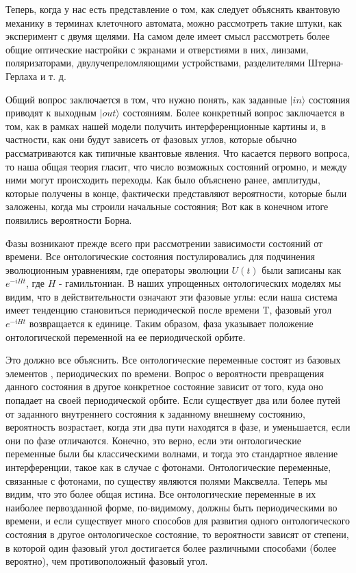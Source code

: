 \documentclass[main.tex]{subfiles}
\begin{document}
Теперь, когда у нас есть представление о том, как следует объяснять квантовую механику в терминах клеточного автомата, можно рассмотреть такие штуки, как эксперимент с двумя щелями. На самом деле имеет смысл рассмотреть более общие оптические настройки с экранами и отверстиями в них, линзами, поляризаторами, двулучепреломляющими устройствами, разделителями Штерна-Герлаха и т. д.

Общий вопрос заключается в том, что нужно понять, как заданные $| in\rangle$ состояния приводят к выходным $| out\rangle$ состояниям. Более конкретный вопрос заключается в том, как в рамках нашей модели получить интерференционные картины и, в частности, как они будут зависеть от фазовых углов, которые обычно рассматриваются как типичные квантовые явления.
Что касается первого вопроса, то наша общая теория гласит, что число возможных состояний огромно, и между ними могут происходить переходы. Как было объяснено ранее, амплитуды, которые получены в конце, фактически представляют вероятности, которые были заложены, когда мы строили начальные состояния; Вот как в конечном итоге появились вероятности Борна.

Фазы возникают прежде всего при рассмотрении зависимости состояний от времени. Все онтологические состояния постулировались для подчинения эволюционным уравнениям, где операторы эволюции $U(t)$ были записаны как $e^{-iHt}$, где $H$ - гамильтониан. В наших упрощенных онтологических моделях мы видим, что в действительности означают эти фазовые углы: если наша система имеет тенденцию становиться периодической после времени T, фазовый угол $e^{-iHt}$ возвращается к единице. Таким образом, фаза указывает положение онтологической переменной на ее периодической орбите.

Это должно все объяснить. Все онтологические переменные состоят из базовых элементов , периодических по времени. Вопрос о вероятности превращения данного состояния в другое конкретное состояние зависит от того,  куда оно попадает на своей периодической орбите. Если существует два или более путей от заданного внутреннего состояния к заданному внешнему состоянию, вероятность возрастает, когда эти два пути находятся в фазе, и уменьшается, если они по фазе отличаются. Конечно, это верно, если эти онтологические переменные были бы классическими волнами, и тогда это стандартное явление интерференции, такое как в случае с фотонами. Онтологические переменные, связанные с фотонами, по существу являются полями Максвелла. Теперь мы видим, что это более общая истина. Все онтологические переменные в их наиболее первозданной форме, по-видимому, должны быть периодическими во времени, и если существует много способов для развития одного онтологического состояния в другое онтологическое состояние, то вероятности зависят от степени, в которой один фазовый угол достигается более различными способами (более вероятно), чем противоположный фазовый угол.
\end{document}
